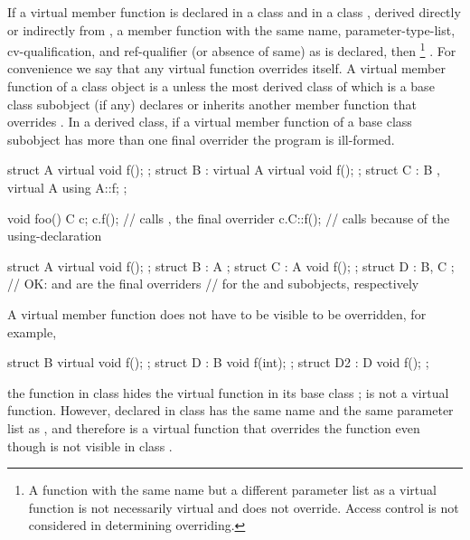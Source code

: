 \pnum
If a virtual member function  is declared in a class
 and in a class , derived directly or
indirectly from , a member function  with the same
name, parameter-type-list, cv-qualification, and ref-qualifier
(or absence of same) as  is declared,
then  \footnote{A function
with the same name but a different parameter list
as a virtual function is not necessarily virtual and
does not override. Access control is not considered in
determining overriding.}
. For convenience we say that any virtual function
overrides itself.
%
A virtual member function  of a class object  is a  unless the most derived class of which  is a
base class subobject (if any) declares or inherits another member function that overrides
. In a derived class, if a virtual member function of a base class subobject
has more than one final overrider the program is ill-formed.
\begin{example}
\begin{codeblock}
struct A {
  virtual void f();
};
struct B : virtual A {
  virtual void f();
};
struct C : B , virtual A {
  using A::f;
};

void foo() {
  C c;
  c.f();            // calls , the final overrider
  c.C::f();         // calls  because of the using-declaration
}
\end{codeblock}
\end{example}

\begin{example}
\begin{codeblock}
struct A { virtual void f(); };
struct B : A { };
struct C : A { void f(); };
struct D : B, C { };            // OK:  and  are the final overriders
                                // for the  and  subobjects, respectively
\end{codeblock}
\end{example}

\pnum
\begin{note}
A virtual member function does not have to be visible to be overridden,
for example,
\begin{codeblock}
struct B {
  virtual void f();
};
struct D : B {
  void f(int);
};
struct D2 : D {
  void f();
};
\end{codeblock}
the function  in class  hides the virtual
function  in its base class ;  is
not a virtual function. However,  declared in class
 has the same name and the same parameter list as
, and therefore is a virtual function that overrides the
function  even though  is not visible in
class .
\end{note}

